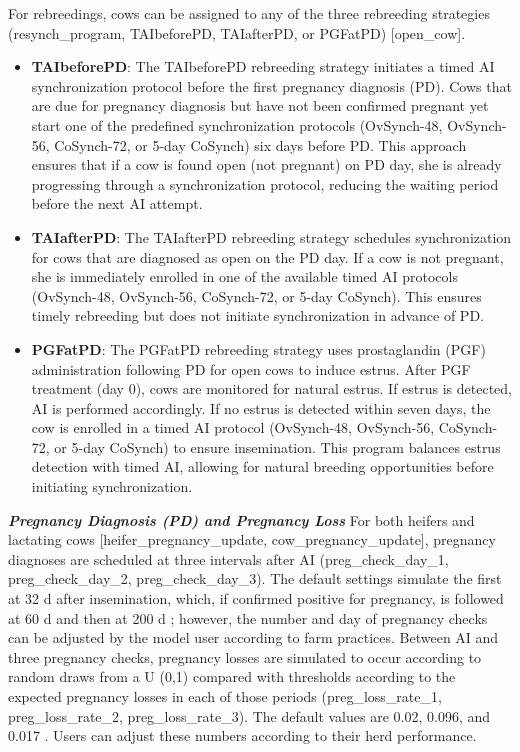 \begin{refsection}
\begin{tcolorbox}[colback=white, colframe=black, title=Important Note]
For rebreedings, cows can be assigned to any of the three rebreeding strategies (resynch\_program, TAIbeforePD, TAIafterPD, or PGFatPD) [open\_cow].
\end{tcolorbox}


    \begin{itemize}
        \item \textbf{TAIbeforePD}: The TAIbeforePD rebreeding strategy initiates a timed AI synchronization protocol before the first pregnancy diagnosis (PD). Cows that are due for pregnancy diagnosis but have not been confirmed pregnant yet start one of the predefined synchronization protocols (OvSynch-48, OvSynch-56, CoSynch-72, or 5-day CoSynch) six days before PD. This approach ensures that if a cow is found open (not pregnant) on PD day, she is already progressing through a synchronization protocol, reducing the waiting period before the next AI attempt.
        \item \textbf{TAIafterPD}: The TAIafterPD rebreeding strategy schedules synchronization for cows that are diagnosed as open on the PD day. If a cow is not pregnant, she is immediately enrolled in one of the available timed AI protocols (OvSynch-48, OvSynch-56, CoSynch-72, or 5-day CoSynch). This ensures timely rebreeding but does not initiate synchronization in advance of PD.
        \item \textbf{PGFatPD}: The PGFatPD rebreeding strategy uses prostaglandin (PGF) administration following PD for open cows to induce estrus. After PGF treatment (day 0), cows are monitored for natural estrus. If estrus is detected, AI is performed accordingly. If no estrus is detected within seven days, the cow is enrolled in a timed AI protocol (OvSynch-48, OvSynch-56, CoSynch-72, or 5-day CoSynch) to ensure insemination. This program balances estrus detection with timed AI, allowing for natural breeding opportunities before initiating synchronization.
    \end{itemize}
    
    \vspace{1cm}
    \textbf{\textit{Pregnancy Diagnosis (PD) and Pregnancy Loss}} For both heifers and lactating cows [heifer\_pregnancy\_update, cow\_pregnancy\_update], pregnancy diagnoses are scheduled at three intervals after AI (preg\_check\_day\_1, preg\_check\_day\_2, preg\_check\_day\_3). The default settings simulate the first at 32 d after insemination, which, if confirmed positive for pregnancy, is followed at 60 d and then at 200 d \parencite{wiltbank2016}; however, the number and day of pregnancy checks can be adjusted by the model user according to farm practices. Between AI and three pregnancy checks, pregnancy losses are simulated to occur according to random draws from a U (0,1) compared with thresholds according to the expected pregnancy losses in each of those periods (preg\_loss\_rate\_1, preg\_loss\_rate\_2, preg\_loss\_rate\_3). The default values are 0.02, 0.096, and 0.017 \parencite{wiltbank2016}. Users can adjust these numbers according to their herd performance.  



\end{refsection}
